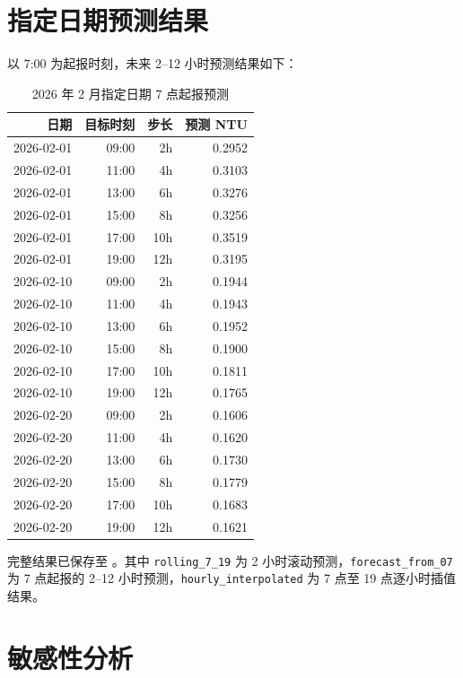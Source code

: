 \documentclass[UTF8,a4paper,12pt]{ctexart}
\begin{document}
\section{指定日期预测结果}

以 7:00 为起报时刻，未来 2--12 小时预测结果如下：

\begin{table}[h]
\centering
\begin{tabular}{rrrr}
\toprule
日期 & 目标时刻 & 步长 & 预测 NTU \\
\midrule
2026-02-01 & 09:00 & 2h  & 0.2952 \\
2026-02-01 & 11:00 & 4h  & 0.3103 \\
2026-02-01 & 13:00 & 6h  & 0.3276 \\
2026-02-01 & 15:00 & 8h  & 0.3256 \\
2026-02-01 & 17:00 & 10h & 0.3519 \\
2026-02-01 & 19:00 & 12h & 0.3195 \\
2026-02-10 & 09:00 & 2h  & 0.1944 \\
2026-02-10 & 11:00 & 4h  & 0.1943 \\
2026-02-10 & 13:00 & 6h  & 0.1952 \\
2026-02-10 & 15:00 & 8h  & 0.1900 \\
2026-02-10 & 17:00 & 10h & 0.1811 \\
2026-02-10 & 19:00 & 12h & 0.1765 \\
2026-02-20 & 09:00 & 2h  & 0.1606 \\
2026-02-20 & 11:00 & 4h  & 0.1620 \\
2026-02-20 & 13:00 & 6h  & 0.1730 \\
2026-02-20 & 15:00 & 8h  & 0.1779 \\
2026-02-20 & 17:00 & 10h & 0.1683 \\
2026-02-20 & 19:00 & 12h & 0.1621 \\
\bottomrule
\end{tabular}
\caption{2026 年 2 月指定日期 7 点起报预测}
\end{table}

完整结果已保存至 。其中 \texttt{rolling\_7\_19} 为 2 小时滚动预测，\texttt{forecast\_from\_07} 为 7 点起报的 2--12 小时预测，\texttt{hourly\_interpolated} 为 7 点至 19 点逐小时插值结果。

\section{敏感性分析}
\end{document}
